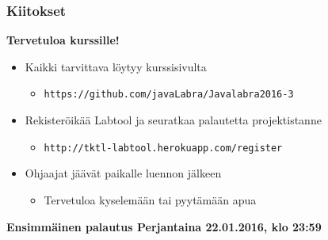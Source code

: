 \documentclass[finnish]{beamer}
\begin{document}
	\begin{frame}
		\frametitle{Kiitokset}

		{\LARGE \textbf{Tervetuloa kurssille!}}
		\begin{itemize}
			\item Kaikki tarvittava löytyy kurssisivulta
			\begin{itemize}
				\item \texttt{https://github.com/javaLabra/Javalabra2016-3}
			\end{itemize}
			\item Rekisteröikää Labtool ja seuratkaa palautetta projektistanne
			\begin{itemize}
				\item \texttt{http://tktl-labtool.herokuapp.com/register}
			\end{itemize}
			\item Ohjaajat jäävät paikalle luennon jälkeen
			\begin{itemize}
				\item Tervetuloa kyselemään tai pyytämään apua 
			\end{itemize}
		\end{itemize}
		\textbf{Ensimmäinen palautus Perjantaina 22.01.2016, klo 23:59}
		
	\end{frame}
	
\end{document}
